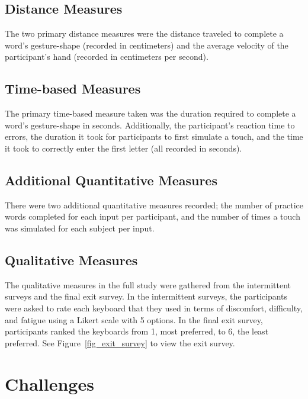 \subsection{Distance Measures}
The two primary distance measures were the distance traveled to complete a word's gesture-shape (recorded in centimeters) and the average velocity of the participant's hand (recorded in centimeters per second).

\subsection{Time-based Measures}
The primary time-based measure taken was the duration required to complete a word's gesture-shape in seconds. Additionally, the participant's reaction time to errors, the duration it took for participants to first simulate a touch, and the time it took to correctly enter the first letter (all recorded in seconds).

\subsection{Additional Quantitative Measures}
There were two additional quantitative measures recorded; the number of practice words completed for each input per participant, and the number of times a touch was simulated for each subject per input.

\subsection{Qualitative Measures}
The qualitative measures in the full study were gathered from the intermittent surveys and the final exit survey. In the intermittent surveys, the participants were asked to rate each keyboard that they used in terms of discomfort, difficulty, and fatigue using a Likert scale with 5 options. In the final exit survey, participants ranked the keyboards from 1, most preferred, to 6, the least preferred. See Figure~\ref{fig_exit_survey} to view the exit survey.

\section{Challenges}
